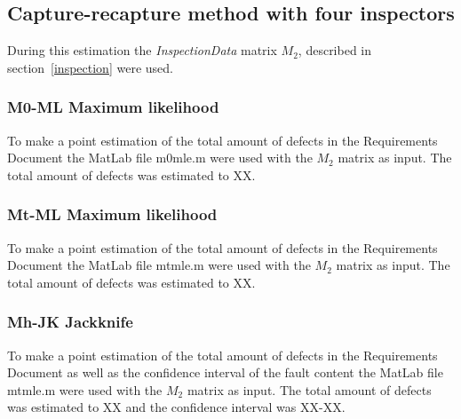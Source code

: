 \subsection{Capture-recapture method with four inspectors}
During this estimation the \textit{InspectionData} matrix $M_{2}$, described in section~\ref{inspection} were used.
\subsubsection{M0-ML Maximum likelihood}
To make a point estimation of the total amount of defects in the Requirements Document the MatLab file m0mle.m were used with the $M_{2}$ matrix as input. The total amount of defects was estimated to XX.
\subsubsection{Mt-ML Maximum likelihood}
To make a point estimation of the total amount of defects in the Requirements Document the MatLab file mtmle.m were used with the $M_{2}$ matrix as input. The total amount of defects was estimated to XX.
\subsubsection{Mh-JK Jackknife}
To make a point estimation of the total amount of defects in the Requirements Document as well as the confidence interval of the fault content the MatLab file mtmle.m were used with the $M_{2}$ matrix as input. The total amount of defects was estimated to XX and the confidence interval was XX-XX.